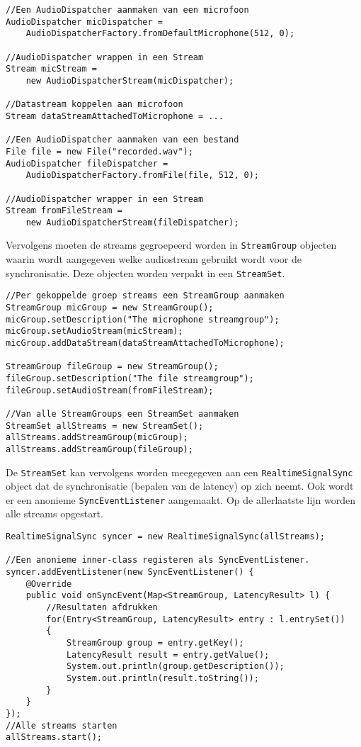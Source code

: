 \begin{lstlisting}
//Een AudioDispatcher aanmaken van een microfoon
AudioDispatcher micDispatcher =
	AudioDispatcherFactory.fromDefaultMicrophone(512, 0);

//AudioDispatcher wrappen in een Stream
Stream micStream = 
	new AudioDispatcherStream(micDispatcher);

//Datastream koppelen aan microfoon
Stream dataStreamAttachedToMicrophone = ...

//Een AudioDispatcher aanmaken van een bestand
File file = new File("recorded.wav");
AudioDispatcher fileDispatcher = 
	AudioDispatcherFactory.fromFile(file, 512, 0);

//AudioDispatcher wrapper in een Stream
Stream fromFileStream = 
	new AudioDispatcherStream(fileDispatcher);	
\end{lstlisting}
\newpage
Vervolgens moeten de streams gegroepeerd worden in \texttt{StreamGroup} objecten waarin wordt aangegeven welke audiostream gebruikt wordt voor de synchronisatie. Deze objecten worden verpakt in een \texttt{StreamSet}. \\

\begin{lstlisting}
//Per gekoppelde groep streams een StreamGroup aanmaken
StreamGroup micGroup = new StreamGroup();
micGroup.setDescription("The microphone streamgroup");
micGroup.setAudioStream(micStream);
micGroup.addDataStream(dataStreamAttachedToMicrophone);

StreamGroup fileGroup = new StreamGroup();
fileGroup.setDescription("The file streamgroup");
fileGroup.setAudioStream(fromFileStream);

//Van alle StreamGroups een StreamSet aanmaken
StreamSet allStreams = new StreamSet();
allStreams.addStreamGroup(micGroup);
allStreams.addStreamGroup(fileGroup);
\end{lstlisting}

De \texttt{StreamSet} kan vervolgens worden meegegeven aan een \texttt{RealtimeSignalSync} object dat de synchronisatie (bepalen van de latency) op zich neemt. Ook wordt er een anonieme \texttt{SyncEventListener} aangemaakt. Op de allerlaatste lijn worden alle streams opgestart.  \\

\begin{lstlisting}
RealtimeSignalSync syncer = new RealtimeSignalSync(allStreams);

//Een anonieme inner-class registeren als SyncEventListener.
syncer.addEventListener(new SyncEventListener() {
	@Override
	public void onSyncEvent(Map<StreamGroup, LatencyResult> l) {
		//Resultaten afdrukken
		for(Entry<StreamGroup, LatencyResult> entry : l.entrySet()) 
		{
			StreamGroup group = entry.getKey();
			LatencyResult result = entry.getValue();
			System.out.println(group.getDescription());
			System.out.println(result.toString());
		}
	}
});
//Alle streams starten
allStreams.start();
\end{lstlisting}

